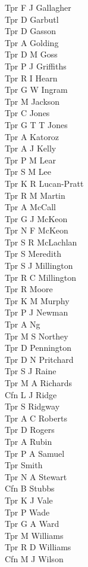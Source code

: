\begin{multicols}{4}
  Tpr F J Gallagher \\
  Tpr D Garbutl \\
  Tpr D Gasson \\
  Tpr A Golding \\
  Tpr D M Goss \\
  Tpr P J Griffiths \\
  Tpr R I Hearn \\
  Tpr G W Ingram \\
  Tpr M Jackson \\
  Tpr C Jones \\
  Tpr G T T Jones \\
  Tpr A Katoroz \\
  Tpr A J Kelly \\
  Tpr P M Lear \\
  Tpr S M Lee \\
  Tpr K R Lucan-Pratt \\
  Tpr R M Martin \\
  Tpr A McCall \\
  Tpr G J McKeon \\
  Tpr N F McKeon \\
  Tpr S R McLachlan \\
  Tpr S Meredith \\
  Tpr S J Millington \\
  Tpr R C Millington \\
  Tpr R Moore \\
  Tpr K M Murphy \\
  Tpr P J Newman \\
  Tpr A Ng \\
  Tpr M S Northey \\
  Tpr D Pennington \\
  Tpr D N Pritchard \\
  Tpr S J Raine \\
  Tpr M A Richards \\
  Cfn L J Ridge \\
  Tpr S Ridgway \\
  Tpr A C Roberts \\
  Tpr D Rogers \\
  Tpr A Rubin \\
  Tpr P A Samuel \\
  Tpr Smith \\
  Tpr N A Stewart \\
  Cfn B Stubbs \\
  Tpr K J Vale \\
  Tpr P Wade \\
  Tpr G A Ward \\
  Tpr M Williams \\
  Tpr R D Williams \\
  Cfn M J Wilson
\end{multicols}

\pagebreak
